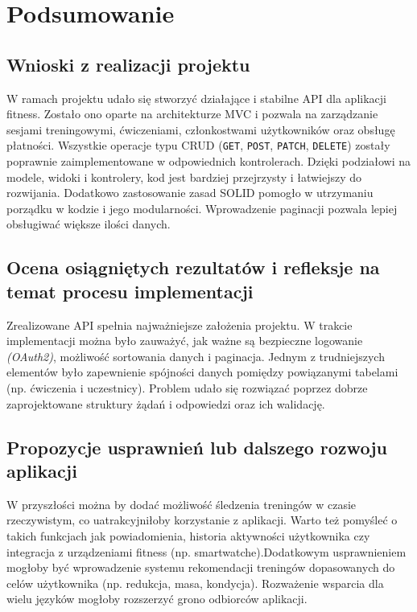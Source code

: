 \documentclass[../../spr.tex]{subfiles}
\begin{document}
\section{Podsumowanie}

\subsection{Wnioski z realizacji projektu}
W ramach projektu udało się stworzyć działające i stabilne API dla aplikacji fitness.
Zostało ono oparte na architekturze MVC i pozwala na zarządzanie sesjami treningowymi,
ćwiczeniami, członkostwami użytkowników oraz obsługę płatności.
Wszystkie operacje typu CRUD (\texttt{GET}, \texttt{POST}, \texttt{PATCH},
\texttt{DELETE}) zostały poprawnie zaimplementowane w odpowiednich kontrolerach.
Dzięki podziałowi na modele, widoki i kontrolery, kod jest bardziej przejrzysty i
łatwiejszy do rozwijania.
Dodatkowo zastosowanie zasad SOLID pomogło w utrzymaniu porządku w kodzie i
jego modularności. Wprowadzenie paginacji pozwala lepiej obsługiwać większe
ilości danych.

\subsection{Ocena osiągniętych rezultatów i refleksje na temat procesu implementacji}
Zrealizowane API spełnia najważniejsze założenia projektu.
W trakcie implementacji można było zauważyć, jak ważne są bezpieczne logowanie \textit{(OAuth2)},
możliwość sortowania danych i paginacja.
Jednym z trudniejszych elementów było zapewnienie spójności danych pomiędzy
powiązanymi tabelami (np. ćwiczenia i uczestnicy).
Problem udało się rozwiązać poprzez dobrze zaprojektowane struktury żądań i
odpowiedzi oraz ich walidację.

\subsection{Propozycje usprawnień lub dalszego rozwoju aplikacji}
W przyszłości można by dodać możliwość śledzenia treningów w czasie rzeczywistym,
co uatrakcyjniłoby korzystanie z aplikacji. Warto też pomyśleć o takich funkcjach
jak powiadomienia, historia aktywności użytkownika czy integracja z urządzeniami
fitness (np. smartwatche).Dodatkowym usprawnieniem mogłoby być
wprowadzenie systemu rekomendacji treningów dopasowanych do celów użytkownika
(np. redukcja, masa, kondycja).
Rozważenie wsparcia dla wielu języków mogłoby rozszerzyć grono odbiorców aplikacji.
\end{document}
